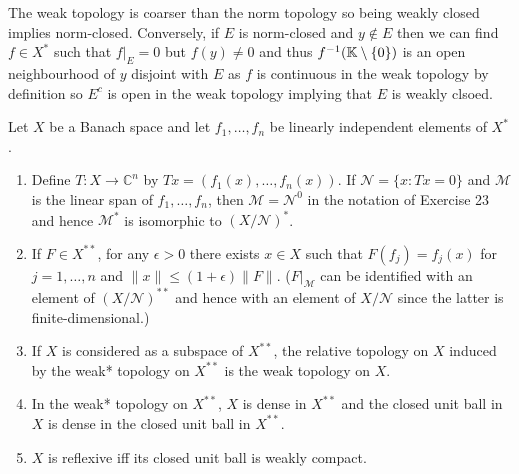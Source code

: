 \documentclass[12pt,a4paper]{article}
\begin{document}
\begin{solution}
    The weak topology is coarser than the norm topology so being weakly closed implies norm-closed. 
    Conversely, if $E$ is norm-closed and $y\notin E$ then we can find $f\in X^*$ such that $f|_E=0$ but $f(y)\neq 0$ and thus $f^{-1}(\mathbb{K}\setminus \qty{0})$ is an open neighbourhood of $y$ disjoint with $E$ as $f$ is continuous in the weak topology by definition so $E^c$ is open in the weak topology implying that $E$ is weakly clsoed. 
\end{solution}
\begin{problem}\label{prob:5-52}
Let $X$ be a Banach space and let $f_1,\dots,f_n$ be linearly independent elements of $X^*$.
\begin{enumerate}[label=\alph*.]
\item Define $T : X \rightarrow \mathbb{C}^n$ by $Tx = (f_1(x),\dots,f_n(x))$. If $\mathcal{N} = \{x : Tx = 0\}$ and $\mathcal{M}$ is the linear span of $f_1,\dots,f_n$, then $\mathcal{M} = \mathcal{N}^0$ in the notation of Exercise 23 and hence $\mathcal{M}^*$ is isomorphic to $(X/\mathcal{N})^*$.
\item If $F \in X^{**}$, for any $\epsilon > 0$ there exists $x \in X$ such that $F(f_j) = f_j(x)$ for $j=1,\dots,n$ and $\|x\| \le (1+\epsilon)\|F\|$. ($F|_\mathcal{M}$ can be identified with an element of $(X/\mathcal{N})^{**}$ and hence with an element of $X/\mathcal{N}$ since the latter is finite-dimensional.)
\item If $X$ is considered as a subspace of $X^{**}$, the relative topology on $X$ induced by the weak* topology on $X^{**}$ is the weak topology on $X$.
\item In the weak* topology on $X^{**}$, $X$ is dense in $X^{**}$ and the closed unit ball in $X$ is dense in the closed unit ball in $X^{**}$.
\item $X$ is reflexive iff its closed unit ball is weakly compact.
\end{enumerate}
\end{problem}
\end{document}
